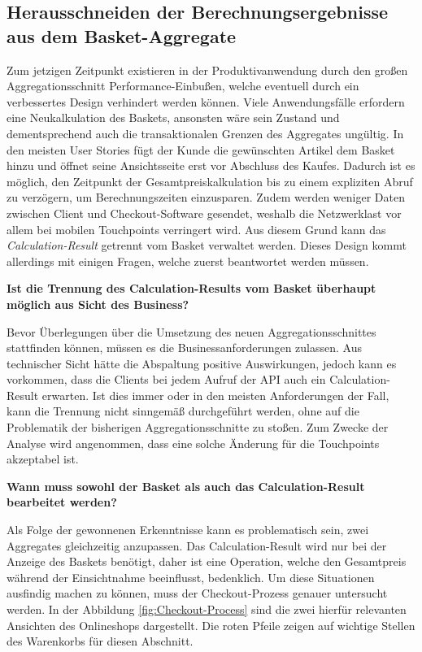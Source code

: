 \subsection{Herausschneiden der Berechnungsergebnisse aus dem Basket-Aggregate}

Zum jetzigen Zeitpunkt existieren in der Produktivanwendung durch den großen Aggregationsschnitt Performance-Einbußen, welche eventuell durch ein verbessertes Design verhindert werden können. Viele Anwendungsfälle erfordern eine Neukalkulation des Baskets, ansonsten wäre sein Zustand und dementsprechend auch die transaktionalen Grenzen des Aggregates ungültig. In den meisten User Stories fügt der Kunde die gewünschten Artikel dem Basket hinzu und öffnet seine Ansichtsseite erst vor Abschluss des Kaufes. Dadurch ist es möglich, den Zeitpunkt der Gesamtpreiskalkulation bis zu einem expliziten Abruf zu verzögern, um Berechnungszeiten einzusparen. Zudem werden weniger Daten zwischen Client und Checkout-Software gesendet, weshalb die Netzwerklast vor allem bei mobilen Touchpoints verringert wird. Aus diesem Grund kann das \emph{Calculation-Result} getrennt vom Basket verwaltet werden. Dieses Design kommt allerdings mit einigen Fragen, welche zuerst beantwortet werden müssen.

\textbf{Ist die Trennung des Calculation-Results vom Basket überhaupt möglich aus Sicht des Business?}

Bevor Überlegungen über die Umsetzung des neuen Aggregationsschnittes stattfinden können, müssen es die Businessanforderungen zulassen. Aus technischer Sicht hätte die Abspaltung positive Auswirkungen, jedoch kann es vorkommen, dass die Clients bei jedem Aufruf der API auch ein Calculation-Result erwarten. Ist dies immer oder in den meisten Anforderungen der Fall, kann die Trennung nicht sinngemäß durchgeführt werden, ohne auf die Problematik der bisherigen Aggregationsschnitte zu stoßen. Zum Zwecke der Analyse wird angenommen, dass eine solche Änderung für die Touchpoints akzeptabel ist.

\textbf{Wann muss sowohl der Basket als auch das Calculation-Result bearbeitet werden?}

Als Folge der gewonnenen Erkenntnisse kann es problematisch sein, zwei Aggregates gleichzeitig anzupassen. Das Calculation-Result wird nur bei der Anzeige des Baskets benötigt, daher ist eine Operation, welche den Gesamtpreis während der Einsichtnahme beeinflusst, bedenklich. Um diese Situationen ausfindig machen zu können, muss der Checkout-Prozess genauer untersucht werden. In der Abbildung \ref{fig:Checkout-Process} sind die zwei hierfür relevanten Ansichten des Onlineshops dargestellt. Die roten Pfeile zeigen auf wichtige Stellen des Warenkorbs für diesen Abschnitt.

